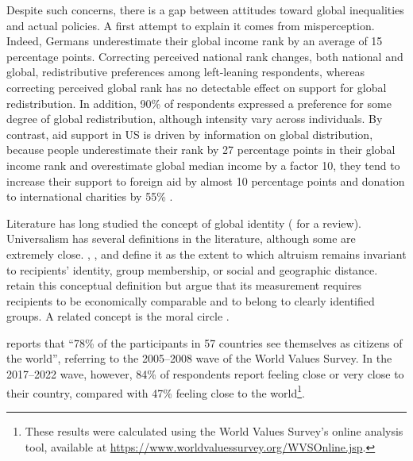 \documentclass[11pt,a4paper]{article}
\begin{document}
Despite such concerns, there is a gap between attitudes toward global inequalities and actual policies. A first attempt to explain it comes from misperception. Indeed, Germans underestimate their global income rank by an average of 15 percentage points. Correcting perceived national rank changes, both national and global, redistributive preferences among left-leaning respondents, whereas correcting perceived global rank has no detectable effect on support for global redistribution. In addition, 90\% of respondents expressed a preference for some degree of global redistribution, although intensity vary across individuals.
By contrast, aid support in US is driven by information on global distribution, because people underestimate their rank by 27 percentage points in their global income rank and overestimate global median income by a factor 10, they tend to increase their support to foreign aid by almost 10 percentage points and donation to international charities by 55\% \citep{nair_misperceptions_2018}.

Literature has long studied the concept of global identity (\citet{rey_2018} for a review). Universalism has several definitions in the literature, although some are extremely close. \citet{enke_moral_2023}, \citet{enke_universalism_2024}, and \citet{cappelen_universalism_2025} define it as the extent to which altruism remains invariant to recipients' identity, group membership, or social and geographic distance. \citet{boyer-kassem_how_2026} retain this conceptual definition but argue that its measurement requires recipients to be economically comparable and to belong to clearly identified groups. A related concept is the moral circle \citep{waytz_ideological_2019,jaeger_toward_2026}.

\citet{bayram_2015} reports that ``78\% of the participants in 57 countries see themselves as citizens of the world'', referring to the 2005--2008 wave of the World Values Survey. In the 2017--2022 wave, however, 84\% of respondents report feeling close or very close to their country, compared with 47\% feeling close to the world\footnote{These results were calculated using the World Values Survey's online analysis tool, available at \url{https://www.worldvaluessurvey.org/WVSOnline.jsp}.}. 
\end{document}
